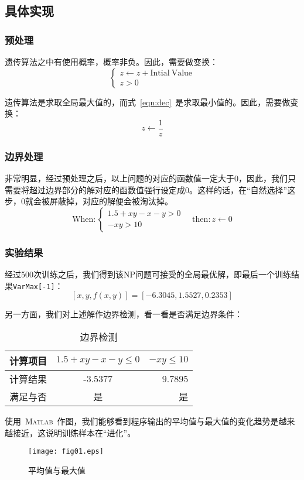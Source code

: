\documentclass[12pt]{article}
\begin{document}
\subsection{具体实现}
\subsubsection{预处理}
遗传算法之中有使用概率，概率非负。因此，需要做变换：
\begin{equation}\left\{
\begin{array}{l}
z  \gets z + \mathrm{Intial~Value}\\
z>0
\end{array}\right.
\end{equation}\par
遗传算法是求取全局最大值的，而式~\eqref{eqn:dec}~是求取最小值的。因此，需要做变换：
\begin{equation}
z\gets \dfrac{1}{z}
\end{equation}
\subsubsection{边界处理}
非常明显，经过预处理之后，以上问题的对应的函数值一定大于0，因此，我们只需要将超过边界部分的解对应的函数值强行设定成0。这样的话，在“自然选择”这步，0就会被屏蔽掉，对应的解便会被淘汰掉。
\begin{equation}
\mathrm{When:}\left\{
\begin{array}{l}
1.5 + xy - x - y > 0\\
 - xy > 10
 \end{array}\right.
 \quad \mathrm{then:}
 z\gets 0
\end{equation}
\subsubsection{实验结果}
经过500次训练之后，我们得到该NP问题可接受的全局最优解，即最后一个训练结果\texttt{VarMax[-1]}：
\begin{equation}
\left[x,y,f\left(x,y\right)\right]= \left[-6.3045 , 1.5527 ,0.2353 \right]
\end{equation}\par
另一方面，我们对上述解作边界检测，看一看是否满足边界条件：
\begin{table}[H]
\centering
\caption{边界检测}
\begin{tabular}{lcr}
\toprule
计算项目&$1.5+xy - x - y \le 0$&$-xy\le 10$
\\\midrule
计算结果&-3.5377 &  9.7895\\
满足与否&是&是
\\\bottomrule
\end{tabular}
\end{table}\par
使用~\textsc{Matlab}~作图，我们能够看到程序输出的平均值与最大值的变化趋势是越来越接近，这说明训练样本在“进化”。
\begin{figure}[H]
\centering
\texttt{[image: fig01.eps]}
\caption{平均值与最大值}
\end{figure}
\end{document}
